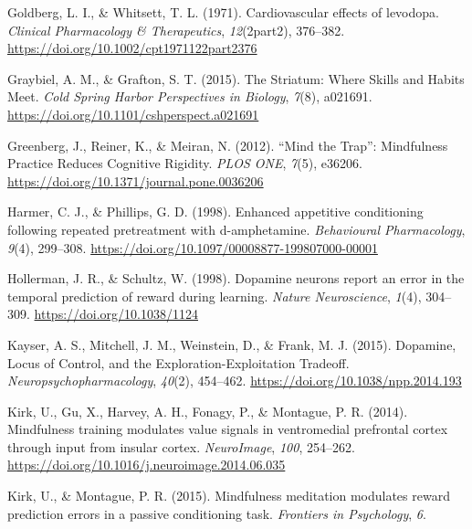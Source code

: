 \documentclass[
  man]{apa6}
\newlength{\cslhangindent}
\newlength{\cslentryspacingunit} %
\newenvironment{CSLReferences}[2] %
 {%
  \setlength{\parindent}{0pt}
  \ifodd #1
  \let\oldpar\par
  \def\par{\hangindent=\cslhangindent\oldpar}
  \fi
  \setlength{\parskip}{#2\cslentryspacingunit}
 }%
 {}
\begin{document}
\begin{CSLReferences}{1}{0}
\leavevmode{}%
Goldberg, L. I., \& Whitsett, T. L. (1971). Cardiovascular effects of levodopa. \emph{Clinical Pharmacology \& Therapeutics}, \emph{12}(2part2), 376--382. \url{https://doi.org/10.1002/cpt1971122part2376}

\leavevmode{}%
Graybiel, A. M., \& Grafton, S. T. (2015). The {Striatum}: {Where Skills} and {Habits Meet}. \emph{Cold Spring Harbor Perspectives in Biology}, \emph{7}(8), a021691. \url{https://doi.org/10.1101/cshperspect.a021691}

\leavevmode{}%
Greenberg, J., Reiner, K., \& Meiran, N. (2012). {``{Mind} the {Trap}''}: {Mindfulness Practice Reduces Cognitive Rigidity}. \emph{PLOS ONE}, \emph{7}(5), e36206. \url{https://doi.org/10.1371/journal.pone.0036206}

\leavevmode{}%
Harmer, C. J., \& Phillips, G. D. (1998). Enhanced appetitive conditioning following repeated pretreatment with d-amphetamine. \emph{Behavioural Pharmacology}, \emph{9}(4), 299--308. \url{https://doi.org/10.1097/00008877-199807000-00001}

\leavevmode{}%
Hollerman, J. R., \& Schultz, W. (1998). Dopamine neurons report an error in the temporal prediction of reward during learning. \emph{Nature Neuroscience}, \emph{1}(4), 304--309. \url{https://doi.org/10.1038/1124}

\leavevmode{}%
Kayser, A. S., Mitchell, J. M., Weinstein, D., \& Frank, M. J. (2015). Dopamine, {Locus} of {Control}, and the {Exploration-Exploitation Tradeoff}. \emph{Neuropsychopharmacology}, \emph{40}(2), 454--462. \url{https://doi.org/10.1038/npp.2014.193}

\leavevmode{}%
Kirk, U., Gu, X., Harvey, A. H., Fonagy, P., \& Montague, P. R. (2014). Mindfulness training modulates value signals in ventromedial prefrontal cortex through input from insular cortex. \emph{NeuroImage}, \emph{100}, 254--262. \url{https://doi.org/10.1016/j.neuroimage.2014.06.035}

\leavevmode{}%
Kirk, U., \& Montague, P. R. (2015). Mindfulness meditation modulates reward prediction errors in a passive conditioning task. \emph{Frontiers in Psychology}, \emph{6}.


\end{CSLReferences}
\end{document}

